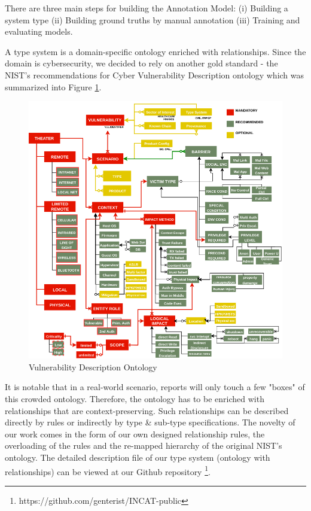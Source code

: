 \documentclass{article} %
\begin{document}
There are three main steps for building the Annotation Model: (i) Building a system type (ii) Building ground truths by manual annotation (iii) Training and evaluating models.

A type system is a domain-specific ontology enriched with relationships. Since the domain is cybersecurity, we decided to rely on another gold standard - the NIST's recommendations for Cyber Vulnerability Description ontology \cite{Booth2016DraftOntology} which was summarized into Figure \ref{Figure:VulOntology}.

\begin{figure}[h]
  \centering
  \includegraphics[width=12cm]{images/NISTIR8138.png}
  \caption{Vulnerability Description Ontology}
  \label{Figure:VulOntology}
\end{figure}

It is notable that in a real-world scenario, reports will only touch a few "boxes" of this crowded ontology. Therefore, the ontology has to be enriched with relationships that are context-preserving. Such relationships can be described directly by rules or indirectly by type \& sub-type specifications. The novelty of our work comes in the form of our own designed relationship rules, the overloading of the rules and the re-mapped hierarchy of the original NIST's ontology. The detailed description file of our type system (ontology with relationships) can be viewed at our Github repository \footnote{https://github.com/genterist/INCAT-public}.
\end{document}
